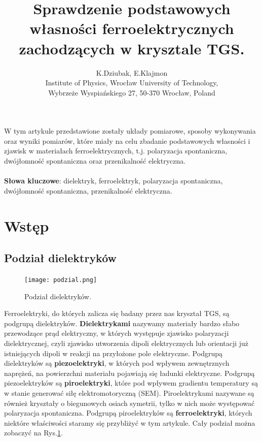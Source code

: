 \documentclass{article}
\begin{document}
\title{Sprawdzenie podstawowych własności ferroelektrycznych zachodzących w krysztale TGS.}
\date{}
\author{K.Dziubak, E.Klajmon\\Institute of Physics, Wrocław University of Technology, \\Wybrzeże
Wyspiańskiego 27, 50-370 Wrocław, Poland}
\maketitle
{}

W tym artykule przedstawione zostały układy pomiarowe, sposoby wykonywania oraz wyniki pomiarów, które miały na celu zbadanie podstawowych własności i zjawisk w materiałach ferroelektrycznych, t.j. polaryzacja spontaniczna, dwójłomność spontaniczna oraz przenikalność elektryczna.

\paragraph{}
\textbf{Słowa kluczowe}: dielektryk, ferroelektryk, polaryzacja spontaniczna, dwójłomność spontaniczna, przenikalność elektryczna.

\section{Wstęp}
\subsection{Podział dielektryków}
\begin{figure}[!h]
	\centering
	\texttt{[image: podzial.png]}
	\caption{Podział dielektryków.}
	\label{fig:podzial}
\end{figure}

Ferroelektryki, do których zalicza się badany przez nas kryształ TGS, są podgrupą dielektryków. \textbf{Dielektrykami} nazywamy materiały bardzo słabo przewodzące prąd elektryczny, w których występuje zjawisko polaryzacji dielektrycznej, czyli zjawisko utworzenia dipoli elektrycznych lub orientacji już istniejących dipoli w reakcji na przyłożone pole elektryczne. Podgrupą dielektryków są \textbf{piezoelektryki}, w których pod wpływem zewnętrznych naprężeń, na powierzchni materiału pojawiają się ładunki elektryczne. Podgrupą piezoelektryków są \textbf{piroelektryki}, które pod wpływem gradientu temperatury są w stanie generować siłę elektromotoryczną (SEM). Piroelektrykami nazywane są również kryształy o biegunowych osiach symetrii, tylko w nich może występować polaryzacja spontaniczna\cite{krajewski}. Podgrupą piroelektryków są \textbf{ferroelektryki}, których niektóre właściwości staramy się przybliżyć w tym artykule. Cały podział można zobaczyć na Rys.\ref{fig:podzial}.
\end{document}
